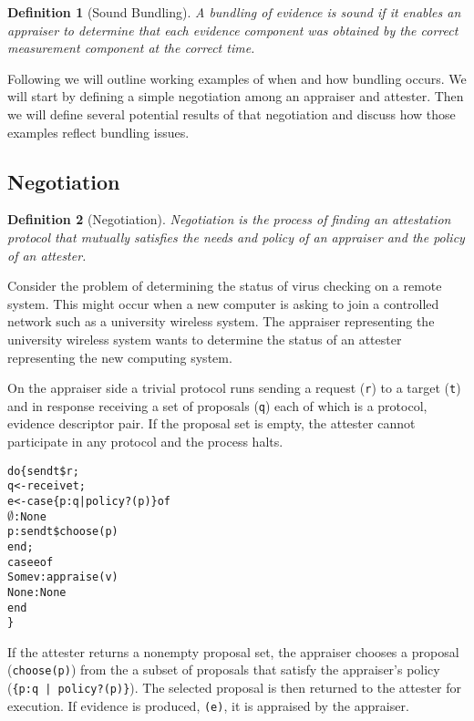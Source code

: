 \documentclass[10pt]{article}
\newtheorem{definition}{Definition}
\begin{document}
\begin{definition}[Sound Bundling]
  A bundling of evidence is sound if it enables an appraiser to
  determine that each evidence component was obtained by the correct
  measurement component at the correct time.
\end{definition}

Following we will outline working examples of when and how bundling
occurs.  We will start by defining a simple negotiation among an
appraiser and attester.  Then we will define several
potential results of that negotiation and discuss how those examples
reflect bundling issues.

\subsection*{Negotiation}

\begin{definition}[Negotiation]
  Negotiation is the process of finding an attestation protocol that
  mutually satisfies the needs and policy of an appraiser and the
  policy of an attester.
\end{definition}

Consider the problem of determining the status of virus checking on a
remote system.  This might occur when a new computer is asking to join
a controlled network such as a university wireless system.  The
appraiser representing the university wireless system wants to
determine the status of an attester representing the new
computing system.

On the appraiser side a trivial protocol runs sending a request
(\Verb+r+) to a target (\Verb+t+) and in response receiving a set of
proposals (\Verb+q+) each of which is a protocol, evidence descriptor
pair.  If the proposal set is empty, the attester cannot participate
in any protocol and the process halts.


\begin{alltt}
  do \{ send t \$ r;
       q <- receive t;
       e <- case \{p:q | policy?(p)\} of
              \(\emptyset\) : None
              p : send t \$ choose(p)
            end;
       case e of 
         Some v : appraise(v)
         None : None
       end
  \}
\end{alltt}

If the attester returns a nonempty proposal set, the appraiser chooses
a proposal (\Verb+choose(p)+) from the a subset of proposals that
satisfy the appraiser's policy (\Verb+{p:q | policy?(p)}+).  The
selected proposal is then returned to the attester for execution.  If
evidence is produced, \Verb+(e)+, it is appraised by the appraiser.
\end{document}
